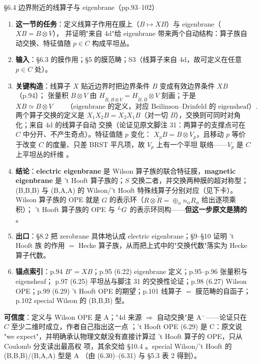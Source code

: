 \begin{kcard}{\S6.4 边界附近的线算子与 eigenbrane（pp.93--102）}
\begin{enumerate}[label=\textbf{\arabic*}]
\item \textbf{这一节的任务}：定义线算子作用在膜上（$B\mapsto XB$）与 eigenbrane（$XB=B\otimes V$），
  并证明"来自 4d"给 eigenbrane 带来两个自动结构：算子族自动交换、特征值随 $p\in C$ 构成平坦丛。
\item \textbf{输入}：\S6.3 的膜作用；\S5 的膜范畴；S3（线算子来自 4d，故可定义在任意 $p\in C$ 处）。
\item \textbf{关键构造}：线算子 $X$ 贴近边界时把边界条件 $B$ 变成有效边界条件 $XB$（p.94）；
  张量积 $B\otimes V$ 由 $H_{\tilde B,B\otimes V}=H_{\tilde B,B}\otimes V$ 刻画；于是
\begin{equation}
XB\simeq B\otimes V \qquad\text{（eigenbrane 的定义，对应 Beilinson--Drinfeld 的 eigensheaf）}.
\label{eq:eigenbrane}
\end{equation}
  两个算子交换的定义是 $X_1X_2B=X_2X_1B$（对一切 $B$），交换则可同时对角化；来自 4d 的线算子自动
  交换（论证见原文脚注 31：两算子的支撑点可在 $C$ 中分开、不产生奇点）。特征值随 $p$ 变化：
  $X_pB=B\otimes V_p$，且移动 $p$ 等价于改变 $C$ 的度量、只差 BRST 平凡项，故 $V_p$ 上有一个平坦
  联络——$V_p$ 是 $C$ 上平坦丛的纤维 \pA{}。
\item \textbf{结论}：\textbf{electric eigenbrane} 是 Wilson 算子族的联合特征膜，\textbf{magnetic
  eigenbrane} 是 't Hooft 算子族的；$S$ 交换二者，并交换两种膜的超对称型；(B,B,B) 与 (B,A,A) 的
  Wilson/'t Hooft 特殊线算子分别对应（见下卡）\pA{}。Wilson 算子族的
  OPE 就是 $G$ 的表示环（$R\otimes\tilde R=\oplus_\alpha n_\alpha R_\alpha$ 给出逐项乘积）；
  't Hooft 算子族的 OPE 与 ${}^{L}G$ 的表示环同构——\textbf{但这一步原文是猜的}
  \pC{}。
\item \textbf{出口}：\S8.2 把 zerobrane 具体地认成 electric eigenbrane；\S9--\S10 证明 't Hooft 族
  的作用 $=$ Hecke 算子族，从而把上式中的"交换代数"落实为 Hecke 算子代数。
\item \textbf{锚点索引}：p.94 $B'=XB$；p.95 (6.22) eigenbrane 定义；p.95--p.96 张量积与 eigensheaf；
  p.97 (6.25) 平坦丛与脚注 31 的交换性论证；p.98 (6.27) Wilson OPE；p.99 (6.29) 't Hooft OPE
  的期望；p.101 线算子 $=$ 膜范畴的自函子；p.102 special Wilson 的 (B,B,B) 型。
\end{enumerate}
\textbf{可信度}：定义与 Wilson OPE 是 A；"4d 来源 $\Rightarrow$ 自动交换"是 A$^-$——论证只在 $C$
至少二维时成立，作者自己指出这一点 \pB{}；'t Hooft OPE (6.29) 是 C：原文说
"we expect"，并明确承认物理文献没有直接计算过 't Hooft 算子的 OPE，只从 Coulomb 分支读出最高权
项，其余交给 \S10.4 \pC{}。special Wilson/'t Hooft 的 (B,B,B)/(B,A,A) 型是 A
（由 (6.30)--(6.31) 与 \S5.3 表 2 得到）\pA{}。
\end{kcard}

